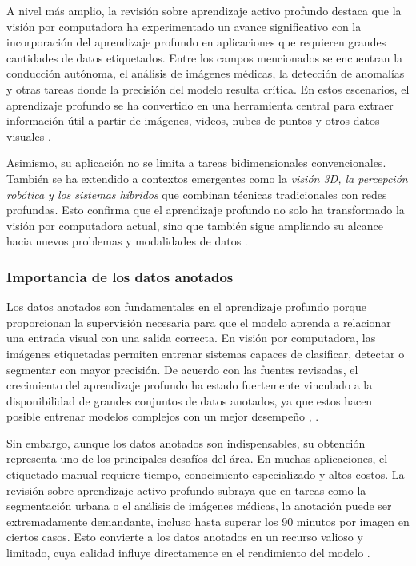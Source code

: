 A nivel más amplio, la revisión sobre aprendizaje activo profundo destaca que la visión por computadora ha experimentado un avance significativo con la incorporación del aprendizaje profundo en aplicaciones que requieren grandes cantidades de datos etiquetados. Entre los campos mencionados se encuentran la conducción autónoma, el análisis de imágenes médicas, la detección de anomalías y otras tareas donde la precisión del modelo resulta crítica. En estos escenarios, el aprendizaje profundo se ha convertido en una herramienta central para extraer información útil a partir de imágenes, videos, nubes de puntos y otros datos visuales \cite{wu2022deep_active_learning}.

Asimismo, su aplicación no se limita a tareas bidimensionales convencionales. También se ha extendido a contextos emergentes como la \textit{visión 3D, la percepción robótica y los sistemas híbridos} que combinan técnicas tradicionales con redes profundas. Esto confirma que el aprendizaje profundo no solo ha transformado la visión por computadora actual, sino que también sigue ampliando su alcance hacia nuevos problemas y modalidades de datos \cite{omahony2019deep_learning_vs_traditional_cv}.

\subsubsection{Importancia de los datos anotados}

Los datos anotados son fundamentales en el aprendizaje profundo porque proporcionan la supervisión necesaria para que el modelo aprenda a relacionar una entrada visual con una salida correcta. En visión por computadora, las imágenes etiquetadas permiten entrenar sistemas capaces de clasificar, detectar o segmentar con mayor precisión. De acuerdo con las fuentes revisadas, el crecimiento del aprendizaje profundo ha estado fuertemente vinculado a la disponibilidad de grandes conjuntos de datos anotados, ya que estos hacen posible entrenar modelos complejos con un mejor desempeño \cite{omahony2019deep_learning_vs_traditional_cv}, \cite{wu2022deep_active_learning}.

Sin embargo, aunque los datos anotados son indispensables, su obtención representa uno de los principales desafíos del área. En muchas aplicaciones, el etiquetado manual requiere tiempo, conocimiento especializado y altos costos. La revisión sobre aprendizaje activo profundo subraya que en tareas como la segmentación urbana o el análisis de imágenes médicas, la anotación puede ser extremadamente demandante, incluso hasta superar los 90 minutos por imagen en ciertos casos. Esto convierte a los datos anotados en un recurso valioso y limitado, cuya calidad influye directamente en el rendimiento del modelo \cite{wu2022deep_active_learning}.

